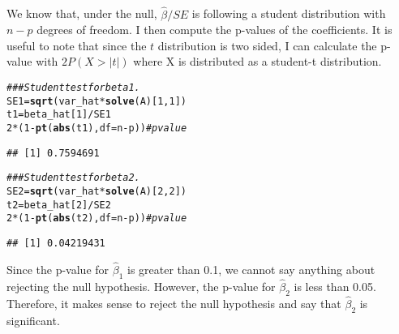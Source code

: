 \documentclass[11pt]{article}\usepackage[]{graphicx}\usepackage[]{color}
\makeatletter
\newcommand{\hlnum}[1]{\textcolor[rgb]{0.686,0.059,0.569}{#1}}%
\newcommand{\hlcom}[1]{\textcolor[rgb]{0.678,0.584,0.686}{\textit{#1}}}%
\newcommand{\hlopt}[1]{\textcolor[rgb]{0,0,0}{#1}}%
\newcommand{\hlstd}[1]{\textcolor[rgb]{0.345,0.345,0.345}{#1}}%
\newcommand{\hlkwb}[1]{\textcolor[rgb]{0.69,0.353,0.396}{#1}}%
\newcommand{\hlkwc}[1]{\textcolor[rgb]{0.333,0.667,0.333}{#1}}%
\newcommand{\hlkwd}[1]{\textcolor[rgb]{0.737,0.353,0.396}{\textbf{#1}}}%
\newenvironment{kframe}{%
 \def\at@end@of@kframe{}%
 \ifinner\ifhmode%
  \def\at@end@of@kframe{\end{minipage}}%
  \begin{minipage}{\columnwidth}%
 \fi\fi%
 \def\FrameCommand##1{\hskip\@totalleftmargin \hskip-\fboxsep
 \colorbox{shadecolor}{##1}\hskip-\fboxsep
     \hskip-\linewidth \hskip-\@totalleftmargin \hskip\columnwidth}%
 \MakeFramed {\advance\hsize-\width
   \@totalleftmargin\z@ \linewidth\hsize
   \@setminipage}}%
 {\par\unskip\endMakeFramed%
 \at@end@of@kframe}
\newenvironment{knitrout}{}{} %
\makeatother
\begin{document}
\subsection{}
We know that, under the null, $\hat{\beta}/SE$ is following a student distribution with $n-p$ degrees of freedom. I then compute the p-values of the coefficients. It is useful to note that since the $t$ distribution is two sided, I can calculate the p-value with $2P(X>|t|)$ where X is distributed as a student-t distribution.
\begin{knitrout}
\color{fgcolor}\begin{kframe}
\begin{alltt}
\hlcom{## # Student test for beta 1.}
\hlstd{SE1} \hlkwb{=} \hlkwd{sqrt}\hlstd{(var_hat}\hlopt{*}\hlkwd{solve}\hlstd{(A)[}\hlnum{1}\hlstd{,}\hlnum{1}\hlstd{])}
\hlstd{t1} \hlkwb{=} \hlstd{beta_hat[}\hlnum{1}\hlstd{]}\hlopt{/}\hlstd{SE1}
\hlnum{2}\hlopt{*}\hlstd{(}\hlnum{1}\hlopt{-}\hlkwd{pt}\hlstd{(}\hlkwd{abs}\hlstd{(t1),}\hlkwc{df}\hlstd{=n}\hlopt{-}\hlstd{p))} \hlcom{#pvalue}
\end{alltt}
\begin{verbatim}
## [1] 0.7594691
\end{verbatim}
\begin{alltt}
\hlcom{## # Student test for beta 2.}
\hlstd{SE2} \hlkwb{=} \hlkwd{sqrt}\hlstd{(var_hat}\hlopt{*}\hlkwd{solve}\hlstd{(A)[}\hlnum{2}\hlstd{,}\hlnum{2}\hlstd{])}
\hlstd{t2} \hlkwb{=} \hlstd{beta_hat[}\hlnum{2}\hlstd{]}\hlopt{/}\hlstd{SE2}
\hlnum{2}\hlopt{*}\hlstd{(}\hlnum{1}\hlopt{-}\hlkwd{pt}\hlstd{(}\hlkwd{abs}\hlstd{(t2),}\hlkwc{df}\hlstd{=n}\hlopt{-}\hlstd{p))} \hlcom{#pvalue}
\end{alltt}
\begin{verbatim}
## [1] 0.04219431
\end{verbatim}
\end{kframe}
\end{knitrout}
Since the p-value for $\hat{\beta}_1$ is greater than 0.1, we cannot say anything about rejecting the null hypothesis. However, the p-value for $\hat{\beta}_2$ is less than 0.05. Therefore, it makes sense to reject the null hypothesis and say that $\hat{\beta}_2$ is significant.
\end{document}
